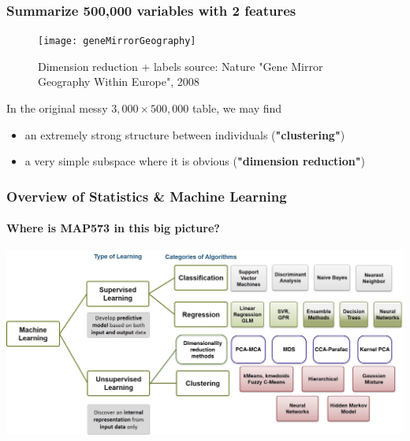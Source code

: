 \documentclass{beamer}\usepackage[]{graphicx}\usepackage[]{color}
\begin{document}
\begin{frame}
  \frametitle{Summarize 500,000 variables with 2 features}

  \begin{figure}
    \centering
      \texttt{[image: geneMirrorGeography]}
    \caption{Dimension reduction + labels {\tiny source: Nature "Gene  Mirror Geography Within  Europe", 2008}}
  \end{figure}

  In the original messy $3,000 \times 500,000$ table, we may find
  \begin{itemize}
    \item an extremely strong structure between individuals (\alert{\bf "clustering"})
    \item a very simple subspace where it is obvious (\alert{\bf "dimension reduction"})
  \end{itemize}

\end{frame}

\begin{frame}
	\frametitle{Overview of Statistics \& Machine Learning}
	\framesubtitle{Where is MAP573 in this big picture?}

	\begin{center}
		\includegraphics[width=\textwidth]{figures/Learning+Types.jpg}
	\end{center}

\end{frame}
\end{document}

